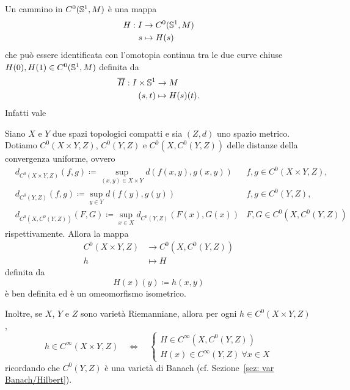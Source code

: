 Un cammino in \(C^0(\mathbb{S}^1,M)\) è una mappa
\begin{align*}
	H: I &\to C^0(\mathbb{S}^1,M) \\
	s &\mapsto H(s)
\end{align*}
che può essere identificata con l'omotopia continua tra le due curve chiuse \(H(0),H(1) \in C^0(\mathbb{S}^1,M)\) definita da
\begin{align*}
	\overline{H}: I \times \mathbb{S}^1 &\to M \\
	(s,t) &\mapsto H(s)(t).
\end{align*}
Infatti vale
\begin{lemma}\label{lemma: identificazione curve/omotopie}
	Siano \(X\) e \(Y\) due spazi topologici compatti e sia \((Z,d)\) uno spazio metrico. Dotiamo \(C^0(X \times Y, Z)\), \(C^0(Y,Z)\) e \(C^0(X,C^0(Y,Z))\) delle distanze della convergenza uniforme, ovvero
	\begin{align*}
		& d_{C^0(X \times Y, Z)}(f,g) \coloneq \sup_{(x,y) \in X \times Y} d (f(x,y),g(x,y)) & f,g \in C^0(X \times Y, Z), \\
		& d_{C^0(Y, Z)}(f,g) \coloneq \sup_{y \in Y} d(f(y),g(y)) & f,g \in C^0(Y, Z), \\
		& d_{C^0(X,C^0(Y,Z))}(F,G) \coloneq \sup_{x \in X} d_{C^0(Y, Z)} (F(x),G(x)) & F,G \in C^0(X,C^0(Y, Z))
	\end{align*}
	rispettivamente. Allora la mappa 
	\begin{align}\label{eq: omemom isometrico}
		C^0(X \times Y,Z) &\to C^0(X,C^0(Y,Z))\\
		h &\mapsto H \nonumber
	\end{align}
	definita da
	\[
		H(x)(y) \coloneq h(x,y)
	\]
	è ben definita ed è un omeomorfismo isometrico. 
	
	Inoltre, se \(X\), \(Y\) e \(Z\) sono varietà Riemanniane, allora per ogni \(h \in C^0(X \times Y, Z)\), 
	\[
		h \in C^\infty(X \times Y, Z) \quad \iff \quad \begin{cases}
			H \in C^\infty(X,C^0(Y,Z))\\
			H(x) \in C^\infty(Y,Z) \ \forall x \in X
		\end{cases}
	\]
	ricordando che \(C^0(Y,Z)\) è una varietà di Banach (cf. Sezione~\ref{sez: var Banach/Hilbert}).
\end{lemma}
